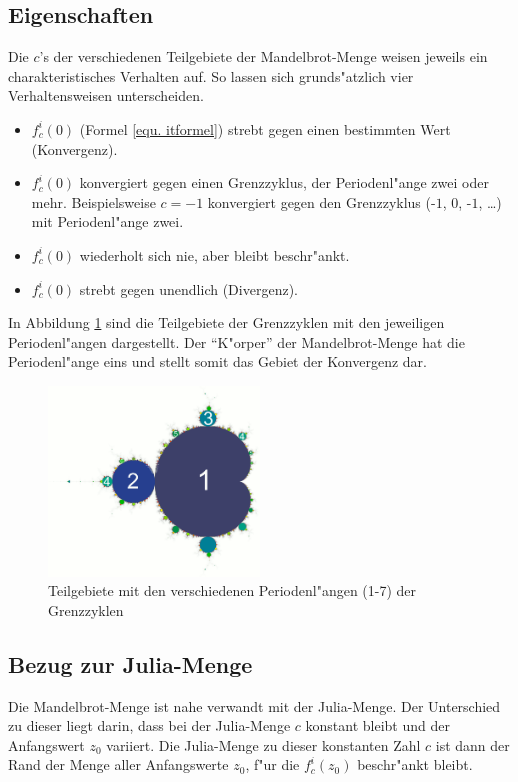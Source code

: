 \begin{refsection}
\subsection{Eigenschaften}
Die $c$'s der verschiedenen Teilgebiete der Mandelbrot-Menge
weisen jeweils ein charakteristisches Verhalten auf. So lassen sich
grunds"atzlich vier Verhaltensweisen unterscheiden.
\begin{itemize}
\item $f_c^i(0)$ (Formel \ref{equ. itformel}) strebt gegen einen
bestimmten Wert (Konvergenz).
\item $f_c^i(0)$ konvergiert gegen einen Grenzzyklus, der Periodenl"ange
zwei oder mehr. Beispielsweise $c=-1$ konvergiert gegen den Grenzzyklus
(-$1$, $0$, -$1$, \dots) mit Periodenl"ange zwei.
\item $f_c^i(0)$ wiederholt sich nie, aber bleibt beschr"ankt.
\item $f_c^i(0)$ strebt gegen unendlich (Divergenz).
\end{itemize}
In Abbildung \ref{fig. grenzzyklen} sind die Teilgebiete der Grenzzyklen
mit den jeweiligen Periodenl"angen dargestellt. Der ``K"orper'' der
Mandelbrot-Menge hat die Periodenl"ange eins und stellt somit das Gebiet
der Konvergenz dar. \cite{wiki} \\[-0.8cm]
\begin{figure}[ht!]\centering
	\includegraphics[width=0.5\textwidth]{apfel/pic/perioden_mandelbrotmenge.png}
	\caption{Teilgebiete mit den verschiedenen Periodenl"angen (1-7) der Grenzzyklen \cite{wikiBild}}
	\label{fig. grenzzyklen}
\end{figure}

\subsection{Bezug zur Julia-Menge}
Die Mandelbrot-Menge ist nahe verwandt mit der Julia-Menge. Der
Unterschied zu dieser liegt darin, dass bei der Julia-Menge $c$ konstant
bleibt und der Anfangswert $z_0$ variiert. Die Julia-Menge zu dieser
konstanten Zahl $c$ ist dann der Rand der Menge aller Anfangswerte $z_0$,
f"ur die $f_c^i(z_0)$ beschr"ankt bleibt.


\end{refsection}

